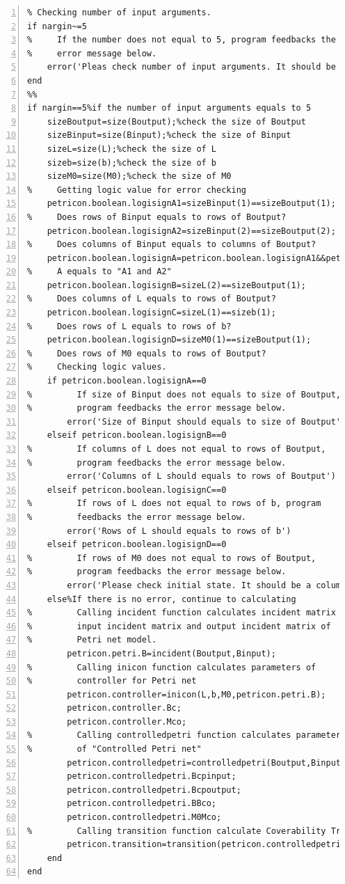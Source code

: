 \documentclass[11pt]{article}
\begin{document}
\begin{flushleft}
\begin{lstlisting}[numbers=left]
%%
% Checking number of input arguments.
if nargin~=5
%     If the number does not equal to 5, program feedbacks the
%     error message below.
    error('Pleas check number of input arguments. It should be 5')
end
%%
if nargin==5%if the number of input arguments equals to 5
    sizeBoutput=size(Boutput);%check the size of Boutput
    sizeBinput=size(Binput);%check the size of Binput
    sizeL=size(L);%check the size of L
    sizeb=size(b);%check the size of b
    sizeM0=size(M0);%check the size of M0
%     Getting logic value for error checking
    petricon.boolean.logisignA1=sizeBinput(1)==sizeBoutput(1);
%     Does rows of Binput equals to rows of Boutput?
    petricon.boolean.logisignA2=sizeBinput(2)==sizeBoutput(2);
%     Does columns of Binput equals to columns of Boutput?
    petricon.boolean.logisignA=petricon.boolean.logisignA1&&petricon.boolean.logisignA2;
%     A equals to "A1 and A2"
    petricon.boolean.logisignB=sizeL(2)==sizeBoutput(1);
%     Does columns of L equals to rows of Boutput?
    petricon.boolean.logisignC=sizeL(1)==sizeb(1);
%     Does rows of L equals to rows of b?
    petricon.boolean.logisignD=sizeM0(1)==sizeBoutput(1);
%     Does rows of M0 equals to rows of Boutput?
%     Checking logic values. 
    if petricon.boolean.logisignA==0
%         If size of Binput does not equals to size of Boutput,
%         program feedbacks the error message below.
        error('Size of Binput should equals to size of Boutput');
    elseif petricon.boolean.logisignB==0
%         If columns of L does not equal to rows of Boutput,
%         program feedbacks the error message below.
        error('Columns of L should equals to rows of Boutput')
    elseif petricon.boolean.logisignC==0
%         If rows of L does not equal to rows of b, program
%         feedbacks the error message below.
        error('Rows of L should equals to rows of b')
    elseif petricon.boolean.logisignD==0
%         If rows of M0 does not equal to rows of Boutput,
%         program feedbacks the error message below.
        error('Please check initial state. It should be a column vector and has same row(s) with row(s) of Boutput')
    else%If there is no error, continue to calculating
%         Calling incident function calculates incident matrix of
%         input incident matrix and output incident matrix of
%         Petri net model.
        petricon.petri.B=incident(Boutput,Binput);
%         Calling inicon function calculates parameters of
%         controller for Petri net
        petricon.controller=inicon(L,b,M0,petricon.petri.B);
        petricon.controller.Bc;
        petricon.controller.Mco;
%         Calling controlledpetri function calculates parameters
%         of "Controlled Petri net"
        petricon.controlledpetri=controlledpetri(Boutput,Binput,petricon.controller.Bc,petricon.controller.Mco,M0);
        petricon.controlledpetri.Bcpinput;
        petricon.controlledpetri.Bcpoutput;
        petricon.controlledpetri.BBco;
        petricon.controlledpetri.M0Mco;
%         Calling transition function calculate Coverability Tree
        petricon.transition=transition(petricon.controlledpetri.Bcpinput,petricon.controlledpetri.BBco,petricon.controlledpetri.M0Mco);
    end
end
\end{lstlisting}


\end{flushleft}
\end{document}

